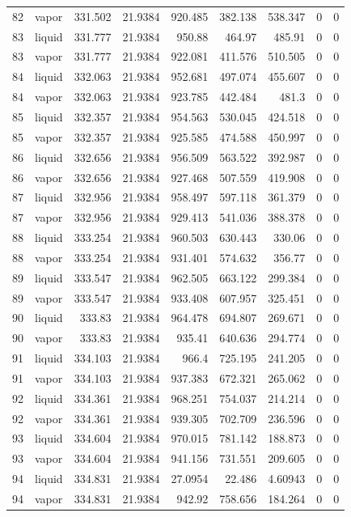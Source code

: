 \begin{longtable}{r l r r r r r r r}
82 & vapor & 331.502 & 21.9384 & 920.485 & 382.138 & 538.347 & 0 & 0 \\
83 & liquid & 331.777 & 21.9384 & 950.88 & 464.97 & 485.91 & 0 & 0 \\
83 & vapor & 331.777 & 21.9384 & 922.081 & 411.576 & 510.505 & 0 & 0 \\
84 & liquid & 332.063 & 21.9384 & 952.681 & 497.074 & 455.607 & 0 & 0 \\
84 & vapor & 332.063 & 21.9384 & 923.785 & 442.484 & 481.3 & 0 & 0 \\
85 & liquid & 332.357 & 21.9384 & 954.563 & 530.045 & 424.518 & 0 & 0 \\
85 & vapor & 332.357 & 21.9384 & 925.585 & 474.588 & 450.997 & 0 & 0 \\
86 & liquid & 332.656 & 21.9384 & 956.509 & 563.522 & 392.987 & 0 & 0 \\
86 & vapor & 332.656 & 21.9384 & 927.468 & 507.559 & 419.908 & 0 & 0 \\
87 & liquid & 332.956 & 21.9384 & 958.497 & 597.118 & 361.379 & 0 & 0 \\
87 & vapor & 332.956 & 21.9384 & 929.413 & 541.036 & 388.378 & 0 & 0 \\
88 & liquid & 333.254 & 21.9384 & 960.503 & 630.443 & 330.06 & 0 & 0 \\
88 & vapor & 333.254 & 21.9384 & 931.401 & 574.632 & 356.77 & 0 & 0 \\
89 & liquid & 333.547 & 21.9384 & 962.505 & 663.122 & 299.384 & 0 & 0 \\
89 & vapor & 333.547 & 21.9384 & 933.408 & 607.957 & 325.451 & 0 & 0 \\
90 & liquid & 333.83 & 21.9384 & 964.478 & 694.807 & 269.671 & 0 & 0 \\
90 & vapor & 333.83 & 21.9384 & 935.41 & 640.636 & 294.774 & 0 & 0 \\
91 & liquid & 334.103 & 21.9384 & 966.4 & 725.195 & 241.205 & 0 & 0 \\
91 & vapor & 334.103 & 21.9384 & 937.383 & 672.321 & 265.062 & 0 & 0 \\
92 & liquid & 334.361 & 21.9384 & 968.251 & 754.037 & 214.214 & 0 & 0 \\
92 & vapor & 334.361 & 21.9384 & 939.305 & 702.709 & 236.596 & 0 & 0 \\
93 & liquid & 334.604 & 21.9384 & 970.015 & 781.142 & 188.873 & 0 & 0 \\
93 & vapor & 334.604 & 21.9384 & 941.156 & 731.551 & 209.605 & 0 & 0 \\
94 & liquid & 334.831 & 21.9384 & 27.0954 & 22.486 & 4.60943 & 0 & 0 \\
94 & vapor & 334.831 & 21.9384 & 942.92 & 758.656 & 184.264 & 0 & 0 \\
\hline
\end{longtable}
